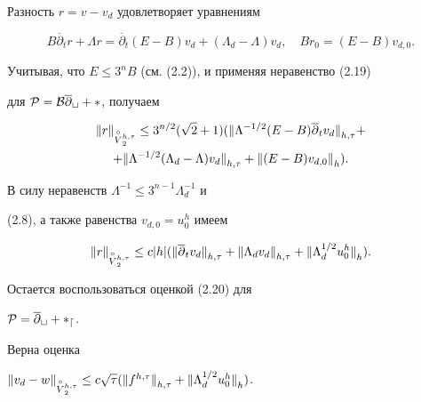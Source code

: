 \begin{pf} Разность $r=v-v_d$ удовлетворяет уравнениям


$$


B\overline\partial_t r+\Lambda r=\overline\partial_t(E-B)v_d+


(\Lambda_d-\Lambda)v_d,\quad Br_0=(E-B)v_{d,0}.


$$


Учитывая, что $E\le 3^nB$ (см. (2.2)), и применяя неравенство (2.19)


для $\cal P=B\overline\partial_t+\Lambda$, получаем


\begin{gather*}


{\ver r \ver}_{\overset{\circ}{V}{}_2^{h,\tau}}\le 3^{n/2}(\sqrt 2+1)


({\ver\Lambda^{-1/2}(E-B)\overline{\partial}_t v_d\ver}_{h,\tau}+\\


+{\ver\Lambda^{-1/2}(\Lambda_d-\Lambda) v_d\ver}_{h,\tau}


+{\ver(E-B)v_{d,0}\ver}_h).


\end{gather*}





В силу неравенств $\Lambda^{-1}\le 3^{n-1}\Lambda_d^{-1}$ и 


(2.8), а также равенства $v_{d,0}=u_0^h$ имеем


$$


{\ver r \ver}_{\overset{\circ}{V}{}_2^{h,\tau}}\le c\vert h\vert


({\ver\overline{\partial}_t v_d\ver}_{h,\tau}+


{\ver\Lambda_d v_d\ver}_{h,\tau}+{\ver\Lambda_d^{1/2}u_0^h\ver}_{h}).


$$


Остается воспользоваться оценкой (2.20) для 


$\cal P=\overline\partial_t+\Lambda_d$.


\end{pf}





\begin{lem} Верна  оценка


${\ver v_d-w \ver}_{\overset{\circ}{V}{}_2^{h,\tau}}\le c\sqrt\tau


({\ver f^{h,\tau}\ver}_{h,\tau}+{\ver\Lambda_d^{1/2}u_0^h\ver}_{h})$.


\end{lem}





